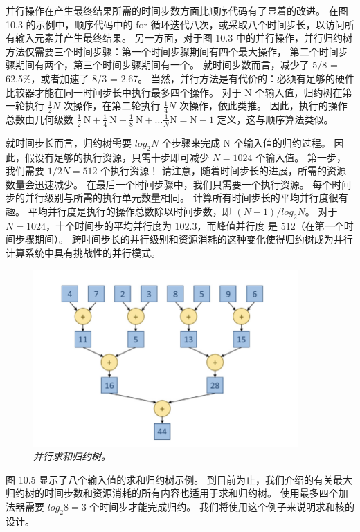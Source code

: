 并行操作在产生最终结果所需的时间步数方面比顺序代码有了显着的改进。 
在图 10.3 的示例中，顺序代码中的 for 循环迭代八次，或采取八个时间步长，以访问所有输入元素并产生最终结果。 
另一方面，对于图 10.3 中的并行操作，并行归约树方法仅需要三个时间步骤：第一个时间步骤期间有四个最大操作，
第二个时间步骤期间有两个，第三个时间步骤期间有一个。 就时间步数而言，减少了 5/8 = 62.5\%，或者加速了 8/3 = 2.67。 
当然，并行方法是有代价的：必须有足够的硬件比较器才能在同一时间步长中执行最多四个操作。 
对于 N 个输入值，归约树在第一轮执行 $\frac{1}{2}N$ 次操作，在第二轮执行 $\frac{1}{4}N$ 次操作，依此类推。 
因此，执行的操作总数由几何级数 $\frac{1}{2} \mathrm{~N}+ \frac{1}{4} \mathrm{~N}+ \frac{1}{8} \mathrm{~N}+\ldots \frac{1}{N} \mathrm{N}=\mathrm{N}-1$ 定义，这与顺序算法类似。

就时间步长而言，归约树需要 $log_2 N$ 个步骤来完成 N 个输入值的归约过程。 
因此，假设有足够的执行资源，只需十步即可减少 $N = 1024$ 个输入值。 
第一步，我们需要 $1/2 N = 512$ 个执行资源！ 请注意，随着时间步长的进展，所需的资源数量会迅速减少。 
在最后一个时间步骤中，我们只需要一个执行资源。 每个时间步的并行级别与所需的执行单元数量相同。 
计算所有时间步长的平均并行度很有趣。 平均并行度是执行的操作总数除以时间步数，即 $(N - 1)/log_2 N$。
对于 $N = 1024$，十个时间步的平均并行度为 102.3，而峰值并行度 是 512（在第一个时间步骤期间）。 
跨时间步长的并行级别和资源消耗的这种变化使得归约树成为并行计算系统中具有挑战性的并行模式。

\begin{figure}[H]
	\centering
	\includegraphics[width=0.9\textwidth]{figs/F10.5.png}
	\caption{\textit{并行求和归约树。}}
\end{figure}

图 10.5 显示了八个输入值的求和归约树示例。 
到目前为止，我们介绍的有关最大归约树的时间步数和资源消耗的所有内容也适用于求和归约树。 
使用最多四个加法器需要 $log_2 8 = 3$ 个时间步才能完成归约。 我们将使用这个例子来说明求和核的设计。

